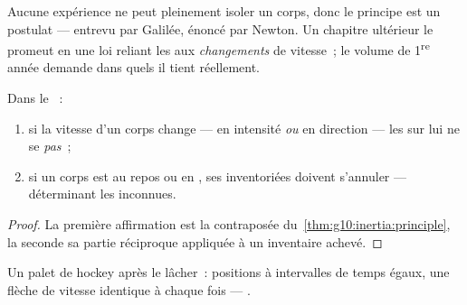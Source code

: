 \begin{remark}
Aucune expérience ne peut pleinement isoler un corps, donc le principe
est un postulat --- entrevu par Galilée, énoncé par Newton. Un chapitre
ultérieur le promeut en une loi reliant les  aux
\emph{changements} de vitesse~; le volume de 1\textsuperscript{re}
année demande dans quels  il tient réellement.
\end{remark}

\begin{proposition}\label{prop:g10:inertia:converse}
Dans le ~:
\begin{enumerate}
  \item si la vitesse d'un corps change --- en intensité \emph{ou} en
        direction --- les  sur lui ne se
         \emph{pas}~;
  \item si un corps est au repos ou en , ses  inventoriées doivent s'annuler ---
        déterminant les inconnues.
\end{enumerate}
\end{proposition}

\begin{proof}
La première affirmation est la contraposée
du~\cref{thm:g10:inertia:principle}, la seconde sa partie réciproque
appliquée à un inventaire achevé.
\end{proof}

\begin{omfigure}

{\small Un palet de hockey après le lâcher~: positions à intervalles de
temps égaux, une flèche de vitesse identique à chaque fois ---
.}
\end{omfigure}

